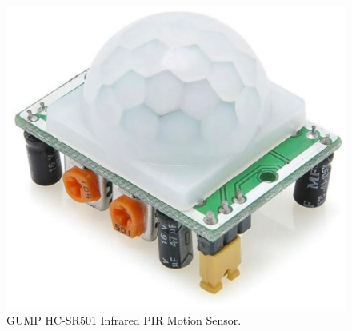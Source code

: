 \begin{figure}[!h]
    \centering
    \includegraphics[width=0.6\columnwidth]{figures/Gump.pdf}
    \caption{GUMP HC-SR501 Infrared PIR Motion Sensor.}
    \label{fig:gump}
\end{figure}